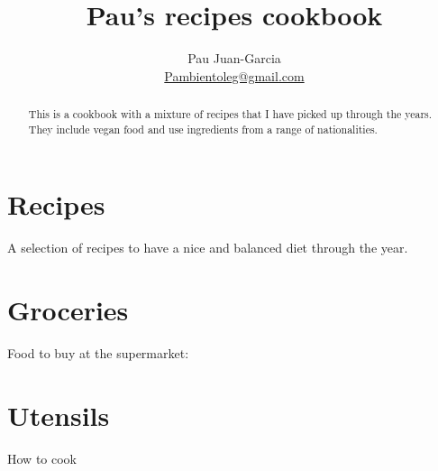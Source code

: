 \documentclass[%
a4paper,
hidelinks,
11pt
]{article}
\begin{document}
\title{Pau's recipes cookbook}
\author{Pau Juan-Garcia\\ \href{mailto:Pambientoleg@gmail.com}{Pambientoleg@gmail.com}}
\maketitle

\begin{abstract}
    \noindent This is a cookbook with a mixture of recipes that I have picked up through the years. They include vegan food and use ingredients from a range of nationalities.
\end{abstract}

\tableofcontents

\vspace{5em}

\section{Recipes}
A selection of recipes to have a nice and balanced diet through the year.





%
%
%
%
%
%
%
%
%
%
%
%
%
%
%
%
%
%
%
%
%
%
%
%
%
%
%
%
%
%
%
%
%
%
%
%
%

\section{Groceries}
Food to buy at the supermarket:


\section{Utensils}
How to cook

\end{document}
